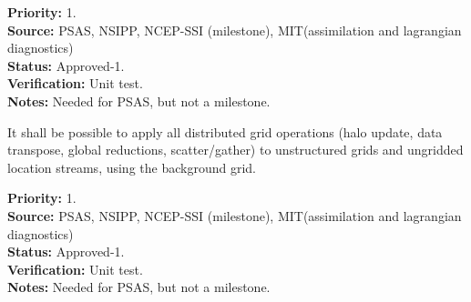 \begin{reqlist}
{\bf Priority:} 1. \\ 
{\bf Source:} PSAS, NSIPP, NCEP-SSI (milestone), MIT(assimilation  and lagrangian diagnostics) \\
{\bf Status:} Approved-1. \\ 
{\bf Verification:} Unit test. \\
{\bf Notes:}  Needed for PSAS, but not a milestone.
\end{reqlist}


It shall be possible to apply all distributed grid operations (halo update,
data transpose, global reductions, scatter/gather) to unstructured
grids and ungridded location streams, using the background grid.

\begin{reqlist}
{\bf Priority:} 1. \\ 
{\bf Source:} PSAS, NSIPP, NCEP-SSI (milestone), MIT(assimilation and lagrangian diagnostics) \\
{\bf Status:} Approved-1. \\
{\bf Verification:} Unit test. \\
{\bf Notes:} Needed for PSAS, but not a milestone.
\end{reqlist}
